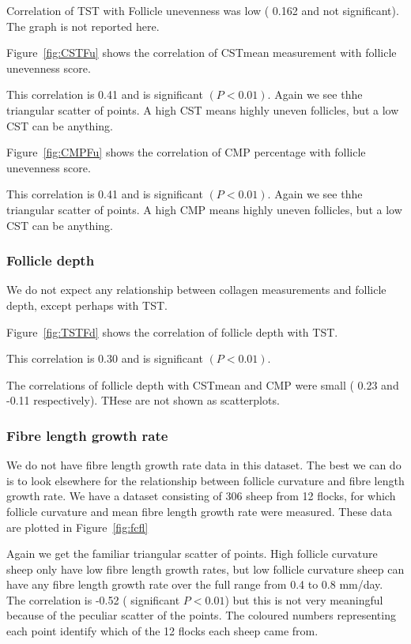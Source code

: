 \documentclass[titlepage]{article}  %
\begin{document}
Correlation of TST with Follicle unevenness was low ( 0.162 and not significant). The graph is not reported here.

Figure~\ref{fig:CSTFu} shows the correlation of CSTmean measurement with follicle unevenness score.

This correlation is 0.41 and is significant $(P<0.01)$. Again we see thhe triangular scatter of points. A high CST means highly uneven follicles, but a low CST can be anything.

Figure~\ref{fig:CMPFu} shows the correlation of CMP percentage with follicle unevenness score.

This correlation is 0.41 and is significant $(P<0.01)$. Again we see thhe triangular scatter of points. A high CMP means highly uneven follicles, but a low CST can be anything.


\subsubsection{Follicle depth}
We do not expect any relationship between collagen measurements and follicle depth, except perhaps with TST.

Figure~\ref{fig:TSTFd} shows the correlation of follicle depth with TST.

This correlation is 0.30 and is significant $(P<0.01)$.

The correlations of follicle depth with CSTmean and CMP were small ( 0.23 and -0.11 respectively). THese are not shown as scatterplots.

\subsubsection{Fibre length growth rate}
We do not have fibre length growth rate data in this dataset.  The best we can do is to look elsewhere for the relationship between follicle curvature and fibre length growth rate.  We have a dataset consisting of 306 sheep from 12 flocks, for which follicle curvature and mean fibre length growth rate were measured.  These data are plotted in Figure~\ref{fig:fcfl}

Again we get the familiar triangular scatter of points. High follicle curvature sheep only have low fibre length growth rates, but low follicle curvature sheep can have any fibre length growth rate over the full range from 0.4 to 0.8 mm/day. The correlation is -0.52 ( significant $P<0.01$) but this is not very meaningful because of the peculiar scatter of the points. The coloured numbers representing each point identify which of the 12 flocks each sheep came from.
\end{document}
